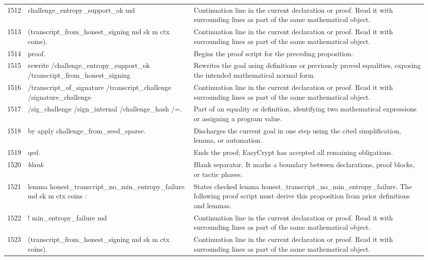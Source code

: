 \documentclass[10pt]{article}
\begin{document}
\begin{longtable}{r L{0.53\textwidth} L{0.37\textwidth}}
1512 & {\ttfamily\scriptsize   challenge\_entropy\_support\_ok md} & Continuation line in the current declaration or proof.  Read it with surrounding lines as part of the same mathematical object. \\
1513 & {\ttfamily\scriptsize     (transcript\_from\_honest\_signing md sk m ctx coins).} & Continuation line in the current declaration or proof.  Read it with surrounding lines as part of the same mathematical object. \\
1514 & {\ttfamily\scriptsize proof.} & Begins the proof script for the preceding proposition. \\
1515 & {\ttfamily\scriptsize rewrite /challenge\_entropy\_support\_ok /transcript\_from\_honest\_signing} & Rewrites the goal using definitions or previously proved equalities, exposing the intended mathematical normal form. \\
1516 & {\ttfamily\scriptsize         /transcript\_of\_signature /transcript\_challenge /signature\_challenge} & Continuation line in the current declaration or proof.  Read it with surrounding lines as part of the same mathematical object. \\
1517 & {\ttfamily\scriptsize         /sig\_challenge /sign\_internal /challenge\_hash /=.} & Part of an equality or definition, identifying two mathematical expressions or assigning a program value. \\
1518 & {\ttfamily\scriptsize by apply challenge\_from\_seed\_sparse.} & Discharges the current goal in one step using the cited simplification, lemma, or automation. \\
1519 & {\ttfamily\scriptsize qed.} & Ends the proof; EasyCrypt has accepted all remaining obligations. \\
1520 & {\ttfamily\scriptsize \emph{blank}} & Blank separator.  It marks a boundary between declarations, proof blocks, or tactic phases. \\
1521 & {\ttfamily\scriptsize lemma honest\_transcript\_no\_min\_entropy\_failure md sk m ctx coins :} & States checked lemma honest\_transcript\_no\_min\_entropy\_failure.  The following proof script must derive this proposition from prior definitions and lemmas. \\
1522 & {\ttfamily\scriptsize   ! min\_entropy\_failure md} & Continuation line in the current declaration or proof.  Read it with surrounding lines as part of the same mathematical object. \\
1523 & {\ttfamily\scriptsize       (transcript\_from\_honest\_signing md sk m ctx coins).} & Continuation line in the current declaration or proof.  Read it with surrounding lines as part of the same mathematical object. \\

\end{longtable}
\end{document}
